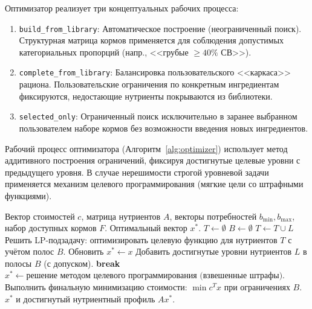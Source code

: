 \documentclass[a4paper,fleqn]{cas-sc}
\begin{document}
Оптимизатор реализует три концептуальных рабочих процесса:
\begin{enumerate}
    \item \texttt{build\_from\_library}: Автоматическое построение (неограниченный поиск). Структурная матрица кормов применяется для соблюдения допустимых категориальных пропорций (напр., <<грубые $\geq 40\%$ СВ>>).
    \item \texttt{complete\_from\_library}: Балансировка пользовательского <<каркаса>> рациона. Пользовательские ограничения по конкретным ингредиентам фиксируются, недостающие нутриенты покрываются из библиотеки.
    \item \texttt{selected\_only}: Ограниченный поиск исключительно в заранее выбранном пользователем наборе кормов без возможности введения новых ингредиентов.
\end{enumerate}

Рабочий процесс оптимизатора (Алгоритм~\ref{alg:optimizer}) использует метод аддитивного построения ограничений, фиксируя достигнутые целевые уровни с предыдущего уровня. В случае нерешимости строгой уровневой задачи применяется механизм целевого программирования (мягкие цели со штрафными функциями).

\begin{algorithm}[htbp]
\caption{Аддитивный иерархический алгоритм оптимизации рационов (Diet Engine)}\label{alg:optimizer}
\begin{algorithmic}[1]
\Require Вектор стоимостей $c$, матрица нутриентов $A$, векторы потребностей $b_{\min}, b_{\max}$, набор доступных кормов $F$.
\Ensure Оптимальный вектор $x^*$.
\State $T \gets \emptyset$ 
\State $B \gets \emptyset$ 
    \State $T \gets T \cup L$
    \State Решить LP-подзадачу: оптимизировать целевую функцию для нутриентов $T$ с учётом полос $B$.
        \State Обновить $x^* \gets x$
        \State Добавить достигнутые уровни нутриентов $L$ в полосы $B$ (с допуском).
    \Else
        \State \textbf{break}
    \EndIf
\EndFor
{}
    \State $x^* \gets \text{решение методом целевого программирования (взвешенные штрафы)}$.
\Else
    \State Выполнить финальную минимизацию стоимости: $\min c^T x$ при ограничениях $B$.
\EndIf
\State \Return $x^*$ и достигнутый нутриентный профиль $A x^*$.
\end{algorithmic}
\end{algorithm}
\end{document}
